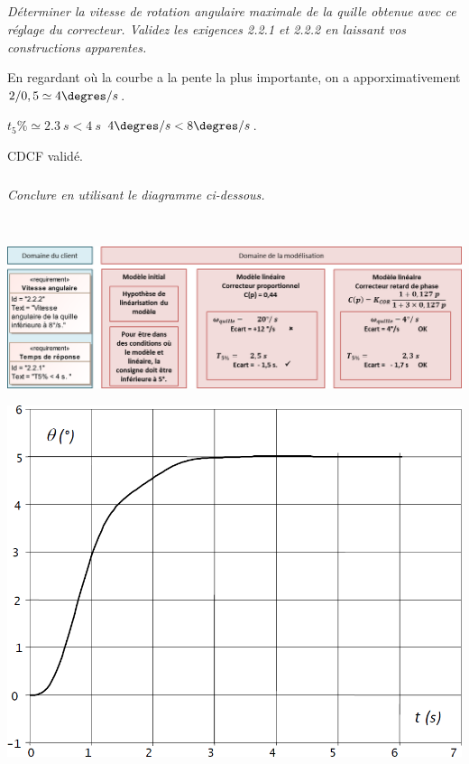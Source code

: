 \documentclass[10pt,fleqn]{article} %
\begin{document}
\begin{multicols}{2}
\subparagraph{}\textit{Déterminer la vitesse de rotation angulaire maximale de la quille obtenue avec ce réglage du
correcteur. Validez les exigences 2.2.1 et 2.2.2 en laissant vos constructions apparentes.}
\ifprof
\begin{corrige}
En regardant où la courbe a la pente la plus importante, on a apporximativement $2/0,5\simeq 4 \degres/s$.

$t_5\%\simeq \SI{2,3}{s}<\SI{4}{s}$ $ 4 \degres/s< 8 \degres/s$.

CDCF validé. 
\end{corrige}
\else
\fi


\subparagraph{}\textit{Conclure en utilisant le diagramme ci-dessous.}
\ifprof
\begin{corrige}~\\
\begin{center}
\includegraphics[width=\linewidth]{images/ecart_cor}
\end{center}
\end{corrige}
\else
\fi



\ifprof
\else
\begin{center}
\includegraphics[width=\linewidth]{images/fig_09}
\end{center}
\fi





\end{multicols}
\end{document}
